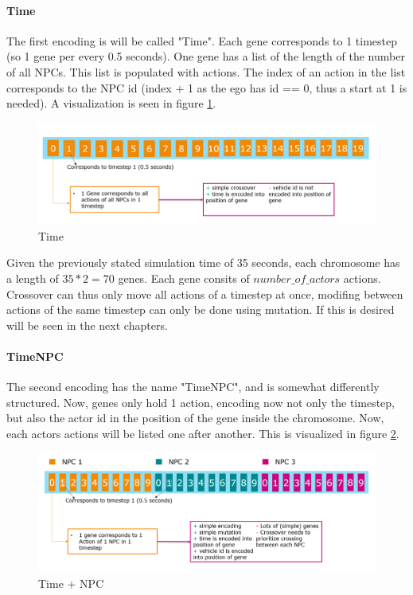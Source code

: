 \paragraph{Time}
The first encoding is will be called "Time". Each gene corresponds to 1 timestep (so 1 gene per every 0.5 seconds). One gene has a list of the length of the number of all NPCs. This list is populated with actions. The index of an action in the list corresponds to the NPC id (index + 1 as the ego has id == 0, thus a start at 1 is needed). A visualization is seen in figure \ref{figure:encoding:chromosome:time}.

\begin{figure}[ht] 
	\includegraphics[width=1\linewidth]{figures/time_encoding}
	\caption{Time}
	\label{figure:encoding:chromosome:time}
\end{figure}


Given the previously stated simulation time of 35 seconds, each chromosome has a length of $35 * 2 = 70$ genes. Each gene consits of $number\_of\_actors$ actions.
Crossover can thus only move all actions of a timestep at once, modifing between actions of the same timestep can only be done using mutation. If this is desired will be seen in the next chapters.


\paragraph{TimeNPC}
The second encoding has the name "TimeNPC", and is somewhat differently structured. Now, genes only hold 1 action, encoding now not only the timestep, but also the actor id in the position of the gene inside the chromosome. Now, each actors actions will be listed one after another. This is visualized in figure \ref{figure:encoding:chromosome:time_npc}.

\begin{figure}[ht] 
	\includegraphics[width=1\linewidth]{figures/time_npc_encoding}
	\caption{Time + NPC}
	\label{figure:encoding:chromosome:time_npc}
\end{figure}

